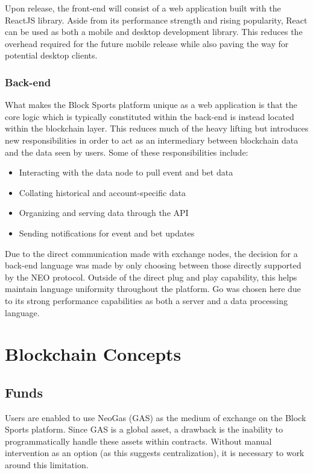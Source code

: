 \documentclass{article}
\begin{document}
Upon release, the front-end will consist of a web application built with the ReactJS library. Aside from its performance strength and rising popularity, React can be used as both a mobile and desktop development library. This reduces the overhead required for the future mobile release while also paving the way for potential desktop clients.

		\subsubsection{Back-end}
What makes the Block Sports platform unique as a web application is that the core logic which is typically constituted within the back-end is instead located within the blockchain layer. This reduces much  of the heavy lifting but introduces new responsibilities in order to act as an intermediary between blockchain data and the data seen by users. Some of these responsibilities include: 

\begin{itemize}
	\item Interacting with the data node to pull event and bet data
	\item Collating historical and account-specific data
	\item Organizing and serving data through the API
	\item Sending notifications for event and bet updates
\end{itemize}

Due to the direct communication made with exchange nodes, the decision for a back-end language was made by only choosing between those directly supported by the NEO protocol. Outside of the direct plug and play capability, this helps maintain language uniformity throughout the platform. Go was chosen here due to its strong performance capabilities as both a server and a data processing language. 

\section{Blockchain Concepts}
	\subsection{Funds}
Users are enabled to use NeoGas (GAS) as the medium of exchange on the Block Sports platform. Since GAS is a global asset, a drawback is the inability to programmatically handle these assets within contracts. Without manual intervention as an option (as this suggests centralization), it is necessary to work around this limitation. 
\end{document}
